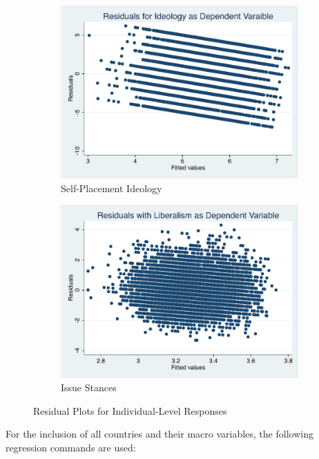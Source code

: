 \documentclass[12pt, titlepage]{article}
\begin{document}
\begin{figure}[H]
	\centering
	\begin{subfigure}[b]{0.475\textwidth}   
		\centering 
		\includegraphics[width=\textwidth]{Residuals/ResidAllIdeo}
		\caption{Self-Placement Ideology}
	\end{subfigure}
	\hfill
	\begin{subfigure}[b]{0.475\textwidth}
		\centering 
		\includegraphics[width=\textwidth]{Residuals/ResidAllLib}
		\caption{Issue Stances}
	\end{subfigure}
	\caption{Residual Plots for Individual-Level Responses}
	\label{AllRVF}
\end{figure}

For the inclusion of all countries and their macro variables, the following regression commands are used:
\end{document}
